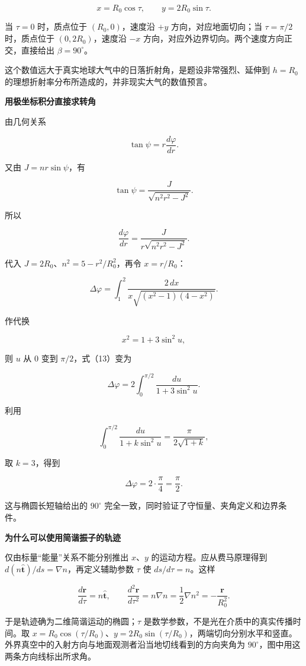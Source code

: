 \documentclass[12pt,a4paper,UTF8]{ctexart}
\begin{document}
\[
x=R_0\cos\tau,
\qquad
y=2R_0\sin\tau.
\]

当 \(\tau=0\) 时，质点位于 \((R_0,0)\)，速度沿 \(+y\)
方向，对应地面切向；当 \(\tau=\pi/2\) 时，质点位于 \((0,2R_0)\)，速度沿
\(-x\) 方向，对应外边界切向。两个速度方向正交，直接给出
\(\beta=90^\circ\)。

这个数值远大于真实地球大气中的日落折射角，是题设非常强烈、延伸到
\(h=R_0\) 的理想折射率分布所造成的，并非现实大气的数值预言。

\textbf{用极坐标积分直接求转角}

由几何关系

\[
\tan\psi=r\frac{d\varphi}{dr}.
\]

又由 \(J=nr\sin\psi\)，有

\[
\tan\psi=\frac{J}{\sqrt{n^2r^2-J^2}}.
\]

所以

\[
\frac{d\varphi}{dr}
=\frac{J}{r\sqrt{n^2r^2-J^2}}.
\tag{12}
\]

代入 \(J=2R_0\)、\(n^2=5-r^2/R_0^2\)，再令 \(x=r/R_0\)：

\[
\Delta\varphi
=\int_1^2
\frac{2\,dx}{x\sqrt{(x^2-1)(4-x^2)}}.
\tag{13}
\]

作代换

\[
x^2=1+3\sin^2u,
\]

则 \(u\) 从 \(0\) 变到 \(\pi/2\)，式（13）变为

\[
\Delta\varphi
=2\int_0^{\pi/2}\frac{du}{1+3\sin^2u}.
\]

利用

\[
\int_0^{\pi/2}\frac{du}{1+k\sin^2u}
=\frac{\pi}{2\sqrt{1+k}},
\]

取 \(k=3\)，得到

\[
\Delta\varphi
=2\cdot\frac{\pi}{4}
=\frac\pi2.
\]

这与椭圆长短轴给出的 \(90^\circ\)
完全一致，同时验证了守恒量、夹角定义和边界条件。

\textbf{为什么可以使用简谐振子的轨迹}

仅由标量``能量''关系不能分别推出 \(x\)、\(y\)
的运动方程。应从费马原理得到
\(d(n\hat{\bm t})/ds=\nabla n\)，再定义辅助参数 \(\tau\) 使
\(ds/d\tau=n\)。这样

\[\frac{d\bm r}{d\tau}=n\hat{\bm t},\qquad \frac{d^2\bm r}{d\tau^2}=n\nabla n=\frac12\nabla n^2=-\frac{\bm r}{R_0^2}.\]

于是轨迹确为二维简谐运动的椭圆；\(\tau\)
是数学参数，不是光在介质中的真实传播时间。取
\(x=R_0\cos(\tau/R_0)\)、\(y=2R_0\sin(\tau/R_0)\)，两端切向分别水平和竖直。外界真空中的入射方向与地面观测者沿当地切线看到的方向夹角为
\(90^\circ\)，图中用这两条方向线标出所求角。
\end{document}
